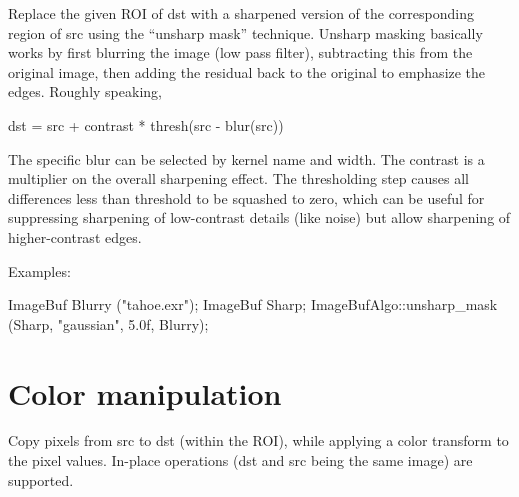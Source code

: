  

Replace the given ROI of {\cf dst} with a sharpened version of the
corresponding region of {\cf src} using the ``unsharp mask'' technique.
Unsharp masking basically works by first blurring the image (low
pass filter), subtracting this from the original image, then
adding the residual back to the original to emphasize the edges.
Roughly speaking,

\begin{code}
     dst = src + contrast * thresh(src - blur(src))
\end{code}

The specific blur can be selected by kernel name and width.  The
{\cf contrast} is a multiplier on the overall sharpening effect.  The
thresholding step causes all differences less than {\cf threshold} to be
squashed to zero, which can be useful for suppressing sharpening of
low-contrast details (like noise) but allow sharpening of
higher-contrast edges.

\smallskip
\noindent Examples:
\begin{code}
    ImageBuf Blurry ("tahoe.exr");
    ImageBuf Sharp;
    ImageBufAlgo::unsharp_mask (Sharp, "gaussian", 5.0f, Blurry);
\end{code}
\apiend


\section{Color manipulation}
\label{sec:iba:color}

 
Copy pixels from {\cf src} to {\cf dst} (within the ROI), while
applying a color transform to the pixel values.
In-place operations ({\cf dst} and {\cf src} being the same image)
are supported.

